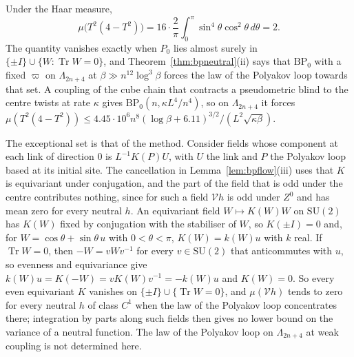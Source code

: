 \documentclass[aps,prd,twocolumn,superscriptaddress,nofootinbib,longbibliography,floatfix,amsmath,amssymb,10pt]{revtex4-2}
\theoremstyle{definition}
\theoremstyle{remark}
\newcommand{\SU}{\mathrm{SU}}
\newcommand{\Tr}{\operatorname{Tr}}
\begin{document}
Under the Haar measure,
\[
\mu\bigl(T^2(4-T^2)\bigr)=16\cdot\frac2\pi\int_0^\pi\sin^4\theta\cos^2
\theta\,d\theta=2 .
\]
The quantity vanishes exactly when $P_0$ lies
almost surely in $\{\pm I\}\cup\{W:\Tr W=0\}$, and
Theorem~\ref{thm:bpneutral}(ii) says that $\mathrm{BP}_0$ with a fixed
$\varpi$ on $\Lambda_{2n+4}$ at $\beta\gg n^{12}\log^3\beta$ forces the law
of the Polyakov loop towards that set. A coupling of the cube chain that
contracts a pseudometric blind to the centre twists at rate $\kappa$ gives
$\mathrm{BP}_0(n,\kappa L^4/n^4)$, so on $\Lambda_{2n+4}$ it forces
$\mu(T^2(4-T^2))\le4.45\cdot10^6n^8(\log\beta+6.11)^{3/2}/(L^2\sqrt{
\kappa\beta})$.

The exceptional set is that of the method. Consider fields whose component
at each link of direction $0$ is $L^{-1}K(P)U$, with $U$ the link and $P$
the Polyakov loop based at its initial site. The cancellation in
Lemma~\ref{lem:bpflow}(iii) uses that $K$ is equivariant under conjugation,
and the part of the field that is odd under the centre contributes nothing,
since for such a field $\mathcal Vh$ is odd under $Z^0$ and has mean zero
for every neutral $h$. An equivariant field $W\mapsto K(W)W$ on $\SU(2)$ has $K(W)$
fixed by conjugation with the stabiliser of $W$, so $K(\pm I)=0$ and, for
$W=\cos\theta+\sin\theta\,u$ with $0<\theta<\pi$, $K(W)=k(W)u$ with $k$
real. If $\Tr W=0$, then $-W=vWv^{-1}$ for every $v\in\SU(2)$ that
anticommutes with $u$, so evenness and equivariance give $k(W)u=K(-W)=v
K(W)v^{-1}=-k(W)u$ and $K(W)=0$. So every even equivariant $K$ vanishes on
$\{\pm I\}\cup\{\Tr W=0\}$, and $\mu(\mathcal Vh)$ tends to zero for every
neutral $h$ of class $C^1$ when the law of the Polyakov loop concentrates
there; integration by parts along such fields then gives no lower bound on
the variance of a neutral function. The law of the Polyakov loop on $\Lambda_{2n+4}$ at weak coupling is
not determined here.
\end{document}
